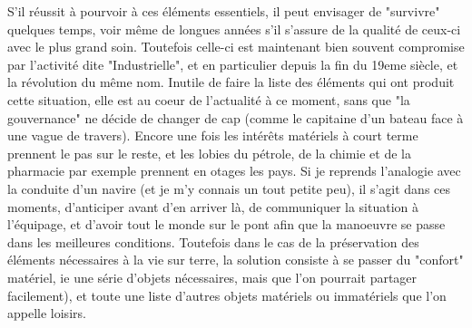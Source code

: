 \documentclass[11pt]{article} %
\begin{document}
S'il réussit à pourvoir à ces éléments essentiels, il peut envisager de "survivre" quelques temps, voir même de longues années s'il s'assure de la qualité de ceux-ci avec le plus grand soin.
Toutefois celle-ci est maintenant bien souvent compromise par l'activité dite "Industrielle", et en particulier depuis la fin du 19eme siècle, et la révolution du même nom.
Inutile de faire la liste des éléments qui ont produit cette situation, elle est au coeur de l'actualité à ce moment, sans que "la gouvernance" ne décide de changer de cap (comme le capitaine d'un bateau face à une vague de travers). Encore une fois les intérêts matériels à court terme prennent le pas sur le reste, et les lobies du pétrole, de la chimie et de la pharmacie par exemple prennent en otages les pays.
Si je reprends l'analogie avec la conduite d'un navire (et je m'y connais un tout petite peu), il s'agit dans ces moments, d'anticiper avant d'en arriver là, de communiquer la situation à l'équipage, et d'avoir tout le monde sur le pont afin que la manoeuvre se passe dans les meilleures conditions.
Toutefois dans le cas de la préservation des éléments nécessaires à la vie sur terre, la solution consiste à se passer du "confort" matériel, ie une série d'objets nécessaires, mais que l'on pourrait partager facilement), et toute une liste d'autres objets matériels ou immatériels que l'on appelle loisirs. 
\end{document}

